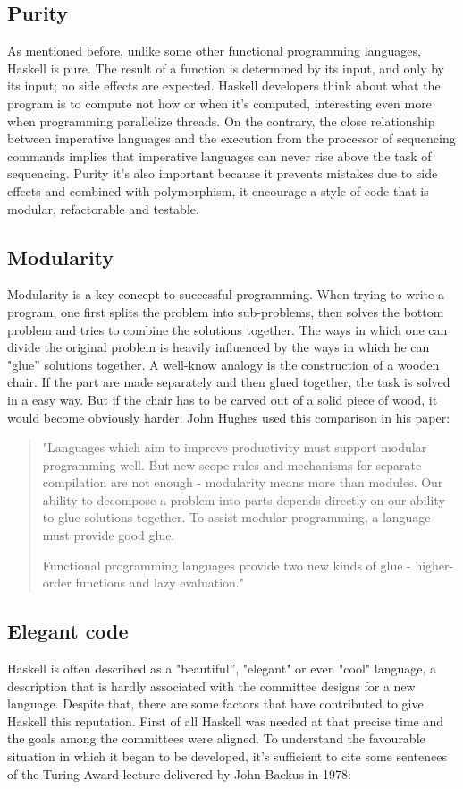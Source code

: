 \documentclass[target=mst,babel=\babelopt]{thud}[2014/01/17]
\begin{document}
\subsection{Purity}
As mentioned before, unlike some other functional programming
languages, Haskell is pure. The result of a function is determined by
its input, and only by its input; no side effects are
expected. Haskell developers think
about what the program is to compute not how or when it's computed,
interesting even more when programming parallelize threads.
On the contrary, the close relationship between imperative
languages and the execution from the processor of sequencing commands
implies that imperative languages can never rise above the task of
sequencing.
Purity it's also important because it prevents mistakes due to side
effects and combined with polymorphism, it encourage a style of code
that is modular, refactorable and testable.


\subsection{Modularity}
Modularity is a key concept to successful programming. When trying to
write a program, one first splits the problem into sub-problems, then
solves the bottom problem and tries to combine the solutions
together. The ways in which one can divide the original problem is
heavily influenced by the ways in which he can "glue'' solutions
together.
A well-know analogy is the construction of a wooden chair. If the part
are made separately and then glued together, the task is solved in a
easy way. But if the chair has to be carved out of a solid piece of
wood, it would become obviously harder. John Hughes used this
comparison in his paper:

\begin{quote}
"Languages which aim to improve productivity must support modular
programming well. But new scope rules and mechanisms for separate
compilation are not enough - modularity means more than modules.
 Our ability to decompose a problem into parts depends directly on our
 ability to glue solutions together.
 To assist modular programming, a language must provide good glue.

Functional programming languages provide two new kinds of glue -
higher-order functions and lazy evaluation."
\cite{hughes:matters-cj}
\end{quote}

\subsection{Elegant code}
Haskell is often described as a "beautiful'', "elegant" or even "cool"
language, a description that is hardly associated  with the committee
designs for a new language. Despite that, there are some factors that
have contributed to give Haskell this reputation.
First of all Haskell was needed at that precise time and the goals
among the committees were aligned. To understand the favourable
situation in which it began to be developed, it's sufficient to cite
some sentences of the Turing Award lecture delivered by John Backus in
1978:
\end{document}
